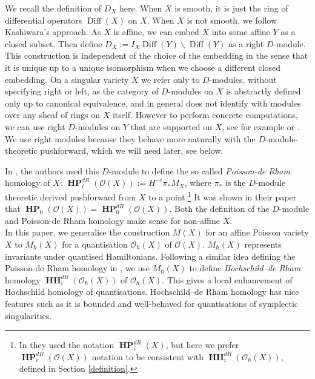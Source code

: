 \documentclass[draft]{article}
\theoremstyle{definition}
\DeclareMathOperator{\Diff}{{Diff}}
\DeclareMathOperator{\HH}{\mathbf{HH}}
\DeclareMathOperator{\HP}{\mathbf{HP}}
\newcommand{\OhX}{\mathcal{O}_\hbar(X)}
\newcommand{\MhX}{M_\hbar(X)}
\begin{document}
We recall the definition of $D_X$ here. When $X$ is smooth, it is just the ring of differential operators $\Diff(X)$ on $X$. When $X$ is not smooth, we follow Kashiwara's approach. As $X$ is affine, we can embed $X$ into some affine $Y$ as a closed subset. Then define $D_X:=I_X\Diff(Y)\backslash\Diff(Y)$ as a right $D$-module. This construction is independent of the choice of the embedding in the sense that it is unique up to a unique isomorphism when we choose a different closed embedding. On a singular variety $X$ we refer only to $D$-modules, without specifying right or left, as the category of $D$-modules on $X$ is abstractly defined only
up to canonical equivalence, and in general does not identify with modules over any sheaf of rings
on $X$ itself. However to perform concrete computations, we can use right $D$-modules on $Y$ that are supported on $X$, see for example \cite[Section 1.7.2]{Introduction_to_algebraic_D-modules} or \cite{On_the_derived_ring_of_differential_operators_on_a_singularity}. We use right modules because they behave more naturally with the $D$-module-theoretic pushforward, which we will need later, see below.

In \cite{Poisson_Traces_and_D-Modules_on_Poisson_Varieties}, the authors used this $D$-module to define the so called \textit{Poisson-de Rham} homology of $X$: $\HP^{dR}_{i}(\mathcal{O}(X)):=H^{-i}\pi_*M_X$, where $\pi_*$ is the $D$-module theoretic derived pushforward from $X$ to a point.\footnote{In \cite{Poisson_Traces_and_D-Modules_on_Poisson_Varieties} they used the notation $\HP^{dR}_i(X)$, but here we prefer $\HP^{dR}_i(\mathcal{O}(X))$ notation to be consistent with $\HH^{dR}_i(\OhX)$, defined in Section \ref{definition}.} It was shown in their paper that $\HP_0(\mathcal{O}(X))=\HP^{dR}_{0}(\mathcal{O}(X))$. Both the definition of the $D$-module and Poisson-de Rham homology make sense for non-affine $X$.\\

In this paper, we generalise the construction $M(X)$ for an affine Poisson variety $X$ to $\MhX$ for a quantisation $\OhX$ of $\mathcal{O}(X)$. $\MhX$ represents invariants under quantised Hamiltonians. Following a similar idea defining the Poisson-de Rham homology in \cite{Poisson_Traces_and_D-Modules_on_Poisson_Varieties}, we use $\MhX$ to define \textit{Hochschild--de Rham} homology $\HH^{dR}_i(\OhX)$ of $\OhX$. This gives a local enhancement of Hochschild homology of quantisations. Hochschild--de Rham homology has nice features such as it is bounded and well-behaved for quantisations of symplectic singularities.
\end{document}
